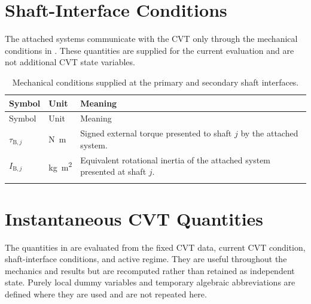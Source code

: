 \documentclass[11pt]{report}
\makeatletter
\numberwithin{equation}{section}
\newcommand{\labelcurrentlongtable}[1]{%
  \edef\@currentlabel{\p@table\thetable}%
  \edef\cref@currentlabel{[table][\arabic{table}][\arabic{chapter}]\thetable}%
  \edef\@currentHref{table.\theHtable}%
  \label{#1}%
}
\makeatother
\begin{document}
\vspace{-1cm}
\section*{Shaft-Interface Conditions}

The attached systems communicate with the CVT only through the mechanical
conditions in . These quantities are
supplied for the current evaluation and are not additional CVT state variables.

\begin{center}
\small
\begin{longtable}{@{}p{}p{}p{}@{}}
\toprule
Symbol & Unit & Meaning \\ \midrule
\endfirsthead
\toprule
Symbol & Unit & Meaning \\ \midrule
\endhead
\bottomrule
\endfoot
\endlastfoot
$\tau_{\mathrm{B},j}$ & \si{\newton\meter} & Signed external torque presented to shaft $j$ by the attached system. \\
$I_{\mathrm{B},j}$ & \si{\kilogram\meter\squared} & Equivalent rotational inertia of the attached system presented at shaft $j$. \\
\bottomrule
\caption{Mechanical conditions supplied at the primary and secondary shaft interfaces.}
\end{longtable}
\labelcurrentlongtable{tab:cvt_shaft_interface_conditions}
\normalsize
\end{center}

\vspace{-1cm}
\section*{Instantaneous CVT Quantities}

The quantities in  are evaluated from
the fixed CVT data, current CVT condition, shaft-interface conditions, and active
regime. They are useful throughout the mechanics and results but are recomputed
rather than retained as independent state. Purely local dummy variables and
temporary algebraic abbreviations are defined where they are used and are not
repeated here.
\end{document}
